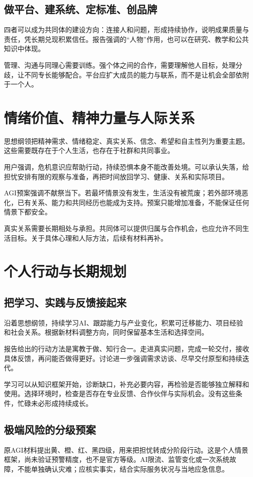 \documentclass[UTF8,zihao=-4,fontset=fandol,oneside,openany]{ctexbook}
\begin{document}
\subsection*{做平台、建系统、定标准、创品牌}
四者可以成为共同体的建设方向：连接人和问题，形成持续协作，说明成果质量与责任，凭长期兑现积累信任。报告强调的“人物”作用，也可以在研究、教学和公共知识中体现。

管理、沟通与同理心需要训练。强个体之间的合作，需要理解他人目标，处理分歧，让不同专长能够配合。平台应扩大成员的能力与联系，而不是让机会全部依附于一个人。

\section{情绪价值、精神力量与人际关系}
思想纲领把精神需求、情绪稳定、真实关系、信念、希望和自主性列为重要主题\cite{principles}。这些需要既存在于个人生活，也存在于社群和共同事业。

用户强调，危机意识应帮助行动，持续恐惧本身不能改善处境。可以承认失落，给担忧安排有限的观察与准备，再把时间放回学习、健康、关系和实际项目。

AGI预案强调不献祭当下。若最坏情景没有发生，生活没有被荒废；若外部环境恶化，已有关系、能力和共同经历也能成为支持。预案只能增加准备，不能保证任何情景下都安全。

真实关系需要长期相处与承担。共同体可以提供归属与合作机会，也应允许不同生活目标。关于具体心理和人际方法，后续有材料再补。

\section{个人行动与长期规划}
\subsection*{把学习、实践与反馈接起来}
沿着思想纲领，持续学习AI、跟踪能力与产业变化，积累可迁移能力、项目经验和社会关系。根据新材料调整方向，同时保留基本生活和选择空间。

报告给出的行动方法是寓教于做、知行合一。走进真实问题，完成一轮交付，接收具体反馈，再问能否做得更好。讨论进一步强调需求访谈、尽早交付原型和持续迭代\cite{xiong,discussion}。

学习可以从知识框架开始，诊断缺口，补充必要内容，再检验是否能够独立解释和使用。选择环境时，检查是否存在专业反馈、合作伙伴与实际机会。没有这些条件，忙碌未必形成持续成长。

\subsection*{极端风险的分级预案}
原AGI材料提出黄、橙、红、黑四级，用来把担忧转成分阶段行动\cite{agi}。这是个人情景框架，尚未验证预警精度，也不是官方等级。AI限流、监管变化或一次系统故障，不能单独确认灾难；应核实事实，结合实际服务状况与当地应急信息。
\end{document}
